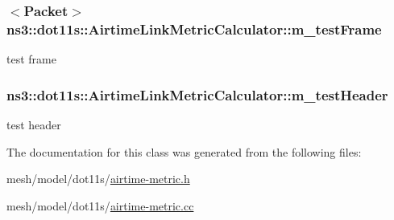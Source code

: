 \subsubsection[{\texorpdfstring{m\+\_\+test\+Frame}{m_testFrame}}]{$<${\bf Packet}$>$ ns3\+::dot11s\+::\+Airtime\+Link\+Metric\+Calculator\+::m\+\_\+test\+Frame\hspace{0.3cm}{\ttfamily [private]}}\hypertarget{classns3_1_1dot11s_1_1AirtimeLinkMetricCalculator_a28cc4e99da4ac3b38604bc512903b677}{}\label{classns3_1_1dot11s_1_1AirtimeLinkMetricCalculator_a28cc4e99da4ac3b38604bc512903b677}


test frame 

\subsubsection[{\texorpdfstring{m\+\_\+test\+Header}{m_testHeader}}]{ ns3\+::dot11s\+::\+Airtime\+Link\+Metric\+Calculator\+::m\+\_\+test\+Header\hspace{0.3cm}{\ttfamily [private]}}\hypertarget{classns3_1_1dot11s_1_1AirtimeLinkMetricCalculator_ab0ae80f5adbf2dedd3346a934baf5943}{}\label{classns3_1_1dot11s_1_1AirtimeLinkMetricCalculator_ab0ae80f5adbf2dedd3346a934baf5943}


test header 



The documentation for this class was generated from the following files\+:\begin{DoxyCompactItemize}
\item 
mesh/model/dot11s/\hyperlink{airtime-metric_8h}{airtime-\/metric.\+h}\item 
mesh/model/dot11s/\hyperlink{airtime-metric_8cc}{airtime-\/metric.\+cc}\end{DoxyCompactItemize}
